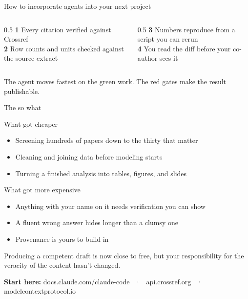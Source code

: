 \documentclass[aspectratio=169,11pt]{beamer}
\begin{document}
\begin{frame}{How to incorporate agents into your next project}
\vspace{0.4em}
\begin{columns}[T]
\begin{column}{0.5\textwidth}
{\scriptsize
\textcolor{fcred}{\textbf{1}} Every citation verified against Crossref \\
\textcolor{fcred}{\textbf{2}} Row counts and units checked against the source extract}
\end{column}
\begin{column}{0.5\textwidth}
{\scriptsize
\textcolor{fcred}{\textbf{3}} Numbers reproduce from a script you can rerun \\
\textcolor{fcred}{\textbf{4}} You read the diff before your co-author sees it}
\end{column}
\end{columns}

\vspace{0.4em}
{\scriptsize The agent moves fastest on the green work. The red gates make the
result publishable.}
\end{frame}

\begin{frame}{The so what}

\begin{block}{\small What got cheaper}
\begin{itemize}\scriptsize
  \item Screening hundreds of papers down to the thirty that matter
  \item Cleaning and joining data before modeling starts
  \item Turning a finished analysis into tables, figures, and slides
\end{itemize}
\end{block}

\begin{block}{\small What got more expensive}
\begin{itemize}\scriptsize
  \item Anything with your name on it needs verification you can show
  \item A fluent wrong answer hides longer than a clumsy one
  \item Provenance is yours to build in
\end{itemize}
\end{block}

\vspace{0.3em}
{\small Producing a competent draft is now close to free, but your responsibility for
the veracity of the content hasn't changed.}

\vspace{0.3em}
{\scriptsize \textbf{Start here:} docs.claude.com/claude-code ~·~ api.crossref.org ~·~ modelcontextprotocol.io}
\end{frame}
\end{document}
